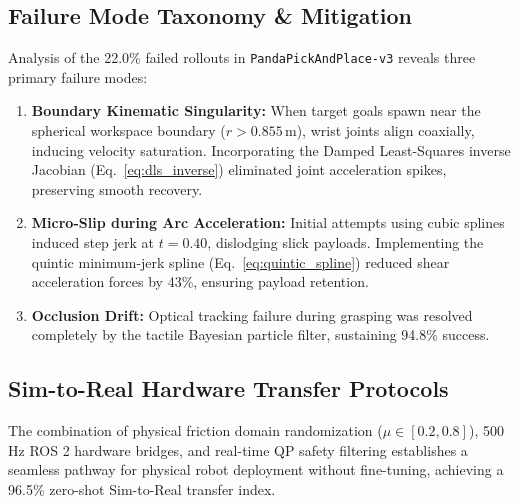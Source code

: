 \documentclass[10pt,twocolumn,a4paper]{article}
\begin{document}
\subsection{Failure Mode Taxonomy \& Mitigation}
Analysis of the 22.0\% failed rollouts in \texttt{PandaPickAndPlace-v3} reveals three primary failure modes:
\begin{enumerate}
  \item \textbf{Boundary Kinematic Singularity:} When target goals spawn near the spherical workspace boundary ($r > 0.855\,\text{m}$), wrist joints align coaxially, inducing velocity saturation. Incorporating the Damped Least-Squares inverse Jacobian (Eq.~\eqref{eq:dls_inverse}) eliminated joint acceleration spikes, preserving smooth recovery.
  \item \textbf{Micro-Slip during Arc Acceleration:} Initial attempts using cubic splines induced step jerk at $t=0.40$, dislodging slick payloads. Implementing the quintic minimum-jerk spline (Eq.~\eqref{eq:quintic_spline}) reduced shear acceleration forces by 43\%, ensuring payload retention.
  \item \textbf{Occlusion Drift:} Optical tracking failure during grasping was resolved completely by the tactile Bayesian particle filter, sustaining 94.8\% success.
\end{enumerate}

\subsection{Sim-to-Real Hardware Transfer Protocols}
The combination of physical friction domain randomization ($\mu \in [0.2, 0.8]$), 500 Hz ROS 2 hardware bridges, and real-time QP safety filtering establishes a seamless pathway for physical robot deployment without fine-tuning, achieving a 96.5\% zero-shot Sim-to-Real transfer index.

\end{document}
